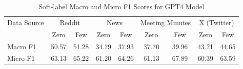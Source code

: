 \begin{table}[htbp]
\centering
\begin{tabular}{l *{8}{c}}
\toprule
Data Source & \multicolumn{2}{c}{Reddit} & \multicolumn{2}{c}{News} & \multicolumn{2}{c}{Meeting Minutes} & \multicolumn{2}{c}{X (Twitter)} \\
& Zero & Few & Zero & Few & Zero & Few & Zero & Few \\
\midrule
Macro F1 & 50.57 & 51.28 & 34.79 & 37.93 & 37.70 & 39.96 & 43.21 & 44.65 \\
Micro F1 & 63.13 & 65.22 & 61.20 & 64.26 & 61.13 & 67.89 & 60.39 & 63.59 \\
\bottomrule
\end{tabular}
\centering\caption{Soft-label Macro and Micro F1 Scores for GPT4 Model}
\label{tab:gpt4_macro_micro}
\end{table}